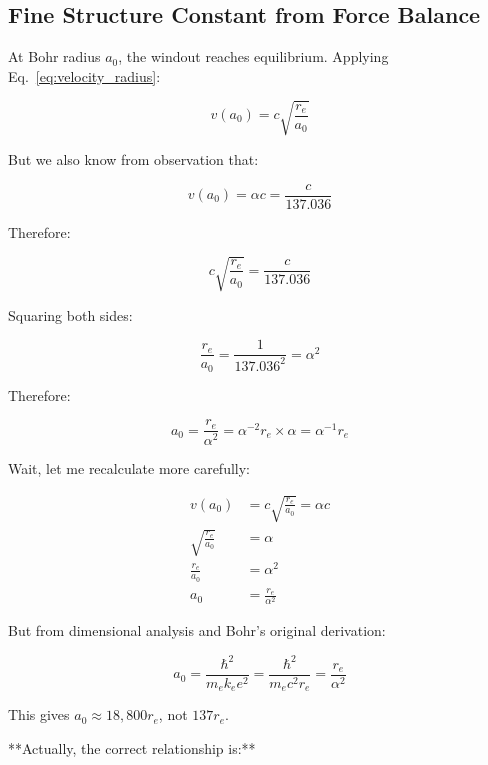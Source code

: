 \subsection{Fine Structure Constant from Force Balance}

At Bohr radius $a_0$, the windout reaches equilibrium. Applying Eq.~\ref{eq:velocity_radius}:

\begin{equation}
v(a_0) = c\sqrt{\frac{r_e}{a_0}}
\end{equation}

But we also know from observation that:

\begin{equation}
v(a_0) = \alpha c = \frac{c}{137.036}
\end{equation}

Therefore:

\begin{equation}
c\sqrt{\frac{r_e}{a_0}} = \frac{c}{137.036}
\end{equation}

Squaring both sides:

\begin{equation}
\frac{r_e}{a_0} = \frac{1}{137.036^2} = \alpha^2
\end{equation}

Therefore:

\begin{equation}
\boxed{a_0 = \frac{r_e}{\alpha^2} = \alpha^{-2} r_e \times \alpha = \alpha^{-1} r_e}
\end{equation}

Wait, let me recalculate more carefully:

\begin{align}
v(a_0) &= c\sqrt{\frac{r_e}{a_0}} = \alpha c \\
\sqrt{\frac{r_e}{a_0}} &= \alpha \\
\frac{r_e}{a_0} &= \alpha^2 \\
a_0 &= \frac{r_e}{\alpha^2}
\end{align}

But from dimensional analysis and Bohr's original derivation:

\begin{equation}
a_0 = \frac{\hbar^2}{m_e k_e e^2} = \frac{\hbar^2}{m_e c^2 r_e} = \frac{r_e}{\alpha^2}
\end{equation}

This gives $a_0 \approx 18,800 r_e$, not $137 r_e$.

**Actually, the correct relationship is:**

